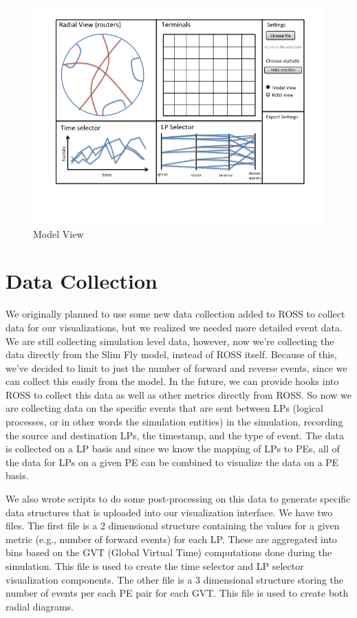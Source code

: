 \documentclass{acm_proc_article-sp}
\begin{document}
\vspace{1cm}
\begin{figure}[!ht]
\centering
   \includegraphics[width=5.0in, clip=true, trim=0 1in 0 0]{../../figures/gui-diagram/Slide1.png}
\caption{Model View}
\label{model-view}
\end{figure}
\section{Data Collection}

We originally planned to use some new data collection added to ROSS to collect data for our visualizations, but we realized we needed more detailed event data. We are still collecting simulation level data, however, now we're collecting the data directly from the Slim Fly model, instead of ROSS itself.  Because of this, we've decided to limit to just the number of forward and reverse events, since we can collect this easily from the model.  In the future, we can provide hooks into ROSS to collect this data as well as other metrics directly from ROSS.  So now we are collecting data on the specific events that are sent between LPs (logical processes, or in other words the simulation entities) in the simulation, recording the source and destination LPs, the timestamp, and the type of event.  The data is collected on a LP basis and since we know the mapping of LPs to PEs, all of the data for LPs on a given PE can be combined to visualize the data on a PE basis.  

We also wrote scripts to do some post-processing on this data to generate specific data structures that is uploaded into our visualization interface.  We have two files. The first file is a 2 dimensional structure containing the values for a given metric (e.g., number of forward events) for each LP. These are aggregated into bins based on the GVT (Global Virtual Time) computations done during the simulation.  This file is used to create the time selector and LP selector visualization components. The other file is a 3 dimensional structure storing the number of events per each PE pair for each GVT. This file is used to create both radial diagrams.
\end{document}
